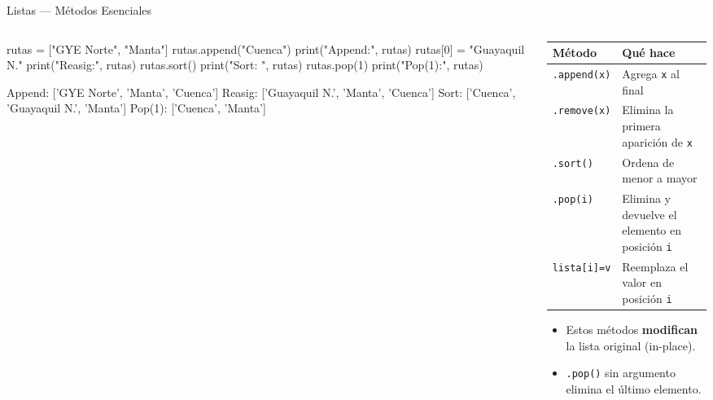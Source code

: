 \documentclass[aspectratio=169, 11pt]{beamer}
\begin{document}
\begin{frame}[fragile,shrink=25]{Listas --- Métodos Esenciales}
  \vspace{-6pt}
  \begin{columns}[T]
    \begin{column}{0.50\textwidth}
      \begin{pyblock}
rutas = ["GYE Norte", "Manta"]
rutas.append("Cuenca")
print("Append:", rutas)
rutas[0] = "Guayaquil N."
print("Reasig:", rutas)
rutas.sort()
print("Sort:  ", rutas)
rutas.pop(1)
print("Pop(1):", rutas)
      \end{pyblock}
      \vspace{-2pt}
      \begin{outputblock}
Append: ['GYE Norte', 'Manta', 'Cuenca']
Reasig: ['Guayaquil N.', 'Manta', 'Cuenca']
Sort:   ['Cuenca', 'Guayaquil N.', 'Manta']
Pop(1): ['Cuenca', 'Manta']
      \end{outputblock}
    \end{column}

    \begin{column}{0.46\textwidth}
      \vspace{2pt}
      {\footnotesize
      \renewcommand{\arraystretch}{1.3}
      \begin{tabular}{@{}l p{4cm}@{}}
        \toprule
        {\bfseries\color{arcaDark} Método} &
        {\bfseries\color{arcaDark} Qué hace} \\
        \midrule
        \texttt{.append(x)}  & Agrega \texttt{x} al final \\
        \texttt{.remove(x)}  & Elimina la primera aparición de \texttt{x} \\
        \texttt{.sort()}     & Ordena de menor a mayor \\
        \texttt{.pop(i)}     & Elimina y devuelve el elemento en posición \texttt{i} \\
        \texttt{lista[i]=v}  & Reemplaza el valor en posición \texttt{i} \\
        \bottomrule
      \end{tabular}
      }

      \vspace{6pt}
      {\footnotesize\color{textMuted}
      \begin{itemize}\setlength{\itemsep}{3pt}
        \item[{\color{arcaRed}\scriptsize\faExclamationTriangle}]
          Estos métodos \textbf{modifican}
          la lista original (in-place).
        \item[{\color{arcaRed}\scriptsize\faExclamationTriangle}]
          \texttt{.pop()} sin argumento
          elimina el último elemento.
      \end{itemize}
      }
    \end{column}
  \end{columns}
\end{frame}
\end{document}

